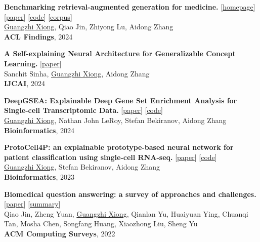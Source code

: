 \documentclass[10pt, letterpaper]{article}
\begin{document}
\begin{enumerate}[label={[\arabic*]}]
            \item \textbf{Benchmarking retrieval-augmented generation for medicine.} [\href{https://gzxiong.github.io/benchmark-medical-rag/}{homepage}] [\href{https://aclanthology.org/2024.findings-acl.372/}{paper}] [\href{https://github.com/gzxiong/MedRAG}{code}] [\href{https://huggingface.co/MedRAG}{corpus}] \\
            \underline{Guangzhi Xiong}, Qiao Jin, Zhiyong Lu, Aidong Zhang \\
            \textbf{ACL Findings}, 2024

            \item \textbf{A Self-explaining Neural Architecture for Generalizable Concept Learning.} [\href{https://www.ijcai.org/proceedings/2024/0056.pdf}{paper}] \\
            Sanchit Sinha, \underline{Guangzhi Xiong}, Aidong Zhang \\
            \textbf{IJCAI}, 2024
            
            \item \textbf{DeepGSEA: Explainable Deep Gene Set Enrichment Analysis for Single-cell Transcriptomic Data.} [\href{https://academic.oup.com/bioinformatics/article/40/7/btae434/7702331}{paper}] [\href{https://github.com/gzxiong/DeepGSEA}{code}] \\
            \underline{Guangzhi Xiong}, Nathan John LeRoy, Stefan Bekiranov, Aidong Zhang \\
            \textbf{Bioinformatics}, 2024

            \item \textbf{ProtoCell4P: an explainable prototype-based neural network for patient classification using single-cell RNA-seq.} [\href{https://doi.org/10.1093/bioinformatics/btad493}{paper}] [\href{https://github.com/gzxiong/ProtoCell4P}{code}] \\
            \underline{Guangzhi Xiong}, Stefan Bekiranov, Aidong Zhang \\
            \textbf{Bioinformatics}, 2023

            \item \textbf{Biomedical question answering: a survey of approaches and challenges.} [\href{https://dl.acm.org/doi/10.1145/3490238}{paper}] [\href{https://github.com/Andy-jqa/biomedical-qa-datasets}{summary}] \\
            Qiao Jin, Zheng Yuan, \underline{Guangzhi Xiong}, Qianlan Yu, Huaiyuan Ying, Chuanqi Tan, Mosha Chen, Songfang Huang, Xiaozhong Liu, Sheng Yu \\
            \textbf{ACM Computing Surveys}, 2022
                    
        \end{enumerate}
\end{document}
